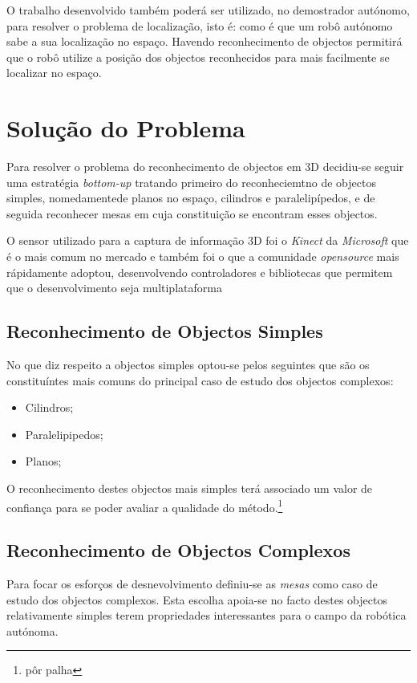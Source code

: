 O trabalho desenvolvido também poderá ser utilizado, no demostrador autónomo, para resolver o problema
de localização, isto é: como é que um robô autónomo sabe a sua localização no espaço. Havendo 
reconhecimento de objectos permitirá que o robô utilize a posição dos objectos reconhecidos para 
mais facilmente se localizar no espaço.



\section{ Solução do Problema}

Para resolver o problema do reconhecimento de objectos em 3D decidiu-se seguir uma estratégia \emph{bottom-up}
tratando primeiro do reconheciemtno de objectos simples, nomedamentede planos no espaço, cilindros e paralelipípedos,
e de seguida reconhecer mesas em cuja constituição se encontram esses objectos.

O sensor utilizado para a captura de informação 3D foi o \emph{Kinect} da \emph{Microsoft} que é o mais comum no mercado
e também foi o que a comunidade \emph{opensource} mais rápidamente adoptou, desenvolvendo controladores e bibliotecas
que permitem que o desenvolvimento seja multiplataforma


\subsection{Reconhecimento de Objectos Simples}

No que diz respeito a objectos simples optou-se pelos seguintes que são os constituíntes mais comuns
do principal caso de estudo dos objectos complexos:
\begin{itemize}
\item Cilindros;
\item Paralelipipedos;
\item Planos;
\end{itemize}

O reconhecimento destes objectos mais simples terá associado um valor de confiança para se poder
avaliar a qualidade do método.\footnote{pôr palha}
 
\subsection{Reconhecimento de Objectos Complexos}

Para focar os esforços de desnevolvimento definiu-se as \emph{mesas} como caso de estudo dos objectos
complexos. Esta escolha apoia-se no facto destes objectos relativamente simples terem
propriedades interessantes para o campo da robótica autónoma.

